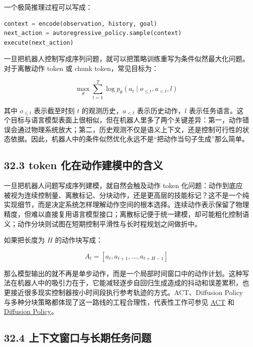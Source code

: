 一个极简推理过程可以写成：

\begin{lstlisting}[language=python]
context = encode(observation, history, goal)
next_action = autoregressive_policy.sample(context)
execute(next_action)
\end{lstlisting}

一旦把机器人控制写成序列问题，就可以把策略训练重写为条件似然最大化问题。对于离散动作 token 或 chunk token，常见目标为：

\begingroup
\footnotesize
\begin{equation*}
\max_\theta \sum_{t=1}^{T}\log p_\theta(a_t \mid o_{\le t}, a_{<t}, l)
\end{equation*}
\endgroup

其中 \(o_{\le t}\) 表示截至时刻 \(t\) 的观测历史，\(a_{<t}\) 表示历史动作，\(l\) 表示任务语言。这个目标与语言模型表面上很相似，但在机器人里多了两个关键差异：第一，动作错误会通过物理系统放大；第二，历史观测不仅是语义上下文，还是控制可行性的状态依据。因此，机器人中的条件似然优化永远不是“把动作当句子生成”那么简单。

\subsection*{32.3 token 化在动作建模中的含义}


一旦把机器人问题写成序列建模，就自然会触及动作 token 化问题：动作到底应被视为连续控制量、离散标记、分块动作，还是更高层的技能标记？这不是一个纯实现细节，而是决定系统怎样理解动作空间的根本选择。连续动作表示保留了物理精度，但难以直接复用语言模型接口；离散标记便于统一建模，却可能粗化控制语义；动作分块则试图在短期控制平滑性与长时程规划之间做折中。

如果把长度为 \(H\) 的动作块写成：

\begin{equation*}
A_t = [a_t, a_{t+1}, \dots, a_{t+H-1}]
\end{equation*}

那么模型输出的就不再是单步动作，而是一个局部时间窗口中的动作计划。这种写法在机器人中的吸引力在于，它能减轻逐步自回归生成造成的抖动和误差累积，也更接近很多现实控制器按小时间段执行参考轨迹的方式。ACT、Diffusion Policy 与多种分块策略都体现了这一路线的工程合理性，代表性工作可参见 \href{https://arxiv.org/abs/2304.13705}{ACT} 和 \href{https://arxiv.org/abs/2303.04137}{Diffusion Policy}。

\subsection*{32.4 上下文窗口与长期任务问题}



